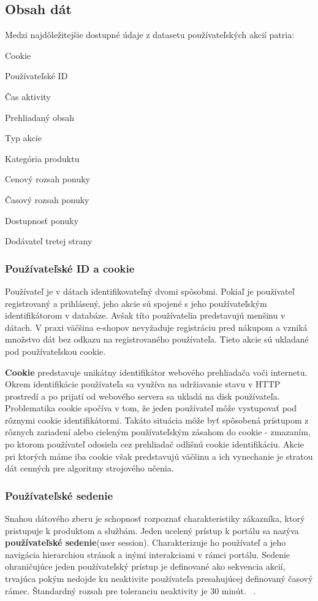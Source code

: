 \subsection{Obsah dát}
Medzi najdôležitejšie dostupné údaje z datasetu používateľských akcií patria:

\begin{my_itemize}
	\item {Cookie}
	\item {Používateľské ID}
	\item {Čas aktivity}
	\item {Prehliadaný obsah}
	\item {Typ akcie}
	\item {Kategória produktu}
	\item {Cenový rozsah ponuky}
	\item {Časový rozsah ponuky}
	\item {Dostupnosť ponuky}
	\item {Dodávateľ tretej strany}
\end{my_itemize}

\subsubsection*{Používateľské ID a cookie} 
Používateľ je v dátach identifikovateľný dvomi spôsobmi. Pokiaľ je používateľ registrovaný a prihlásený, jeho akcie sú spojené s jeho používateľským identifikátorom v databáze. Avšak títo používatelia predstavujú menšinu v dátach. V praxi väčšina e-shopov nevyžaduje registráciu pred nákupom a vzniká množstvo dát bez odkazu na registrovaného používateľa. Tieto akcie sú ukladané pod používateľskou cookie.

\textbf{Cookie} predstavuje unikátny identifikátor webového prehliadača voči internetu. Okrem identifikácie používateľa sa využíva na udržiavanie stavu v HTTP prostredí a po prijatí od webového servera sa ukladá na disk používateľa. Problematika cookie spočíva v tom, že jeden používateľ môže vystupovať pod rôznymi cookie identifikátormi. Takáto situácia môže byť spôsobená prístupom z rôznych zariadení alebo cieleným používateľským zásahom do cookie - zmazaním, po ktorom používateľ odosiela cez prehliadač odlišnú cookie identifikáciu. Akcie pri ktorých máme iba cookie však predstavujú väčšinu a ich vynechanie je stratou dát cenných pre algoritmy strojového učenia.


\subsubsection*{Používateľské sedenie}
\label{session}
Snahou dátového zberu je schopnosť rozpoznať charakteristiky zákazníka, ktorý pristupuje k produktom a službám. Jeden ucelený prístup k portálu sa nazýva \textbf{používateľské sedenie}(user session). Charakterizuje ho používateľ a jeho navigácia hierarchiou stránok a inými interakciami v rámci portálu.  Sedenie ohraničujúce jeden používateľský prístup je definované ako sekvencia akcií, trvajúca pokým nedojde ku neaktivite používateľa presahujúcej definovaný časový rámec. Štandardný rozsah pre toleranciu neaktivity je 30 minút.  ~\cite{zhou2010research}.


